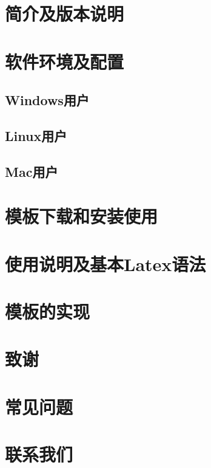 \documentclass[mater,cs4size,twoside]{BUAAthesis}
\begin{document}
\maketitle

\frontmatter
\tableofcontents

\mainmatter
\section{简介及版本说明}
\section{软件环境及配置}
  \subsection{Windows用户}
  \subsection{Linux用户}
  \subsection{Mac用户}
\section{模板下载和安装使用}
\section{使用说明及基本Latex{}语法}
\section{模板的实现}%
\section{致谢}
\clearpage



\appendix%
\section{常见问题}
\section{联系我们}
\clearpage
\end{document}

